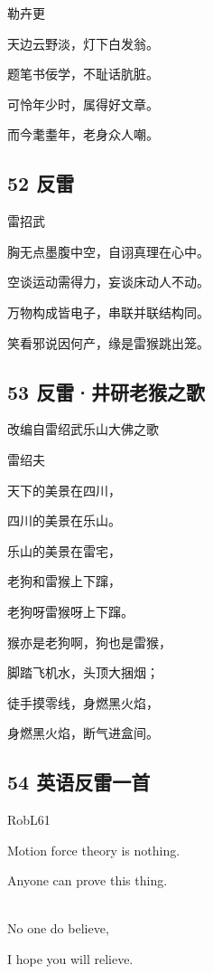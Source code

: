 勒卉更

天边云野淡，灯下白发翁。

题笔书佞学，不耻话肮脏。

可怜年少时，属得好文章。

而今耄耋年，老身众人嘲。

\hypertarget{ux53cdux96f7}{%
\subsection{52 反雷}\label{ux53cdux96f7}}

雷招武

胸无点墨腹中空，自诩真理在心中。

空谈运动需得力，妄谈床动人不动。

万物构成皆电子，串联并联结构同。

笑看邪说因何产，缘是雷猴跳出笼。

\hypertarget{ux53cdux96f7ux4e95ux7814ux8001ux7334ux4e4bux6b4c}{%
\subsection{53
反雷·井研老猴之歌}\label{ux53cdux96f7ux4e95ux7814ux8001ux7334ux4e4bux6b4c}}

改编自雷绍武乐山大佛之歌

雷绍夫

天下的美景在四川，

四川的美景在乐山。

乐山的美景在雷宅，

老狗和雷猴上下蹿，

老狗呀雷猴呀上下蹿。

猴亦是老狗啊，狗也是雷猴，

脚踏飞机水，头顶大捆烟；

徒手摸零线，身燃黑火焰，

身燃黑火焰，断气进盒间。

\hypertarget{ux82f1ux8bedux53cdux96f7ux4e00ux9996}{%
\subsection{54
英语反雷一首}\label{ux82f1ux8bedux53cdux96f7ux4e00ux9996}}

RobL61

Motion force theory is nothing.

Anyone can prove this thing.

~\\
No one do believe,

I hope you will relieve.

